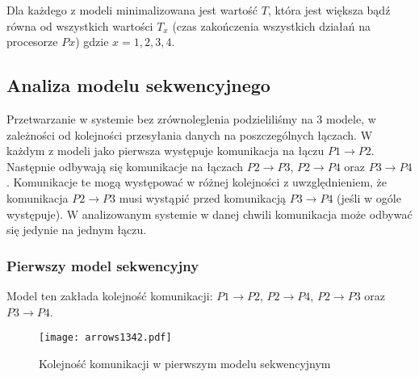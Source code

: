 Dla każdego z modeli minimalizowana jest wartość $T$, która jest większa bądź równa od wszystkich wartości $T_{x}$ (czas zakończenia wszystkich działań na procesorze $Px$) gdzie $x = 1, 2, 3, 4$.

\subsection{Analiza modelu sekwencyjnego}

Przetwarzanie w systemie bez zrównoleglenia podzieliliśmy na 3 modele, w zależności od kolejności przesyłania danych na poszczególnych łączach.
W każdym z modeli jako pierwsza występuje komunikacja na łączu $P1 \to P2$. Następnie odbywają się komunikacje na łączach $P2 \to P3$, $P2 \to P4$ oraz $P3 \to P4$.
Komunikacje te mogą występować w różnej kolejności z uwzględnieniem, że komunikacja $P2 \to P3$ musi wystąpić przed komunikacją $P3 \to P4$ (jeśli w ogóle występuje).
W analizowanym systemie w danej chwili komunikacja może odbywać się jedynie na jednym łączu.

\subsubsection{Pierwszy model sekwencyjny}

Model ten zakłada kolejność komunikacji: $P1 \to P2$, $P2 \to P4$, $P2 \to P3$ oraz $P3 \to P4$.

\begin{figure}[!ht]
\centering
\texttt{[image: arrows1342.pdf]}
\caption{Kolejność komunikacji w pierwszym modelu sekwencyjnym}
\label{fig:seq1}
\end{figure}

